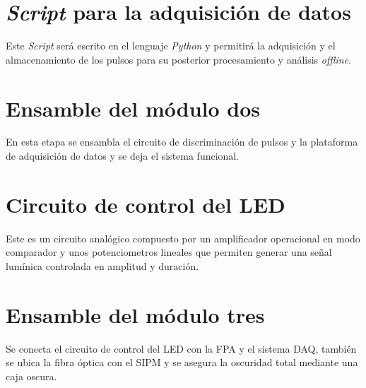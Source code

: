 \documentclass[11pt,letterpaper,oneside]{book}
\begin{document}
    \section{\textbf{\textit{Script} para la adquisición de datos}}
Este \textit{Script} será escrito en el lenguaje \textit{Python} y permitirá la adquisición y el almacenamiento de los pulsos para su posterior procesamiento y análisis \textit{offline}.

	\section{\textbf{Ensamble del módulo dos}}
En esta etapa se ensambla el circuito de discriminación de pulsos y la plataforma de adquisición de datos y se deja el sistema funcional.  

	\section{\textbf{Circuito de control del LED}}
Este es un circuito analógico compuesto por un amplificador operacional en modo comparador y unos potenciometros lineales que permiten generar una señal lumínica controlada en amplitud y duración.   
 
	\section{\textbf{Ensamble del módulo tres}}
Se conecta el circuito de control del LED con la FPA y el sistema DAQ, también se ubica la fibra óptica con el SIPM y se asegura la oscuridad total mediante una caja oscura.  
\end{document}
